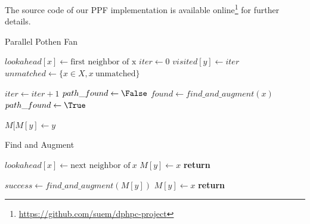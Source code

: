 \documentclass[letterpaper]{article}
\begin{document}
The source code of our PPF implementation is available online\footnote{\url{https://github.com/suem/dphpc-project}} for further details.\\

\begin{algorithm}
    \caption{Parallel Pothen Fan}
    \label{alg:ppf}
    \begin{algorithmic}[1]

        \State $lookahead[x] \gets \text{first neighbor of x}$ 
        \State $iter \gets 0$
        \State $visited[y] \gets iter$ 
        \State $unmatched \gets \{x \in X, x \ \text{unmatched}\}$

        \Repeat 
            \State $iter \gets iter + 1$        
            \State $path\_found \gets \False$        
                \State \Continue {}
            \EndIf
            \State $found \gets find\_and\_augment(x)$        
                \State $path\_found \gets \True$        
            \EndIf
        \EndFor

            \State $M[M[y] \gets y$        
        \EndFor
        
        \EndProcedure
    \end{algorithmic}
\end{algorithm}


\begin{algorithm}
    \caption{Find and Augment}
    \label{alg:fa}
    \begin{algorithmic}[1]


                \State $lookahead[x] \gets \text{next neighbor of}\ x$
                        \State $M[y] \gets x$ 
                        \State \textbf{return} \True
                    \EndIf
                \EndIf
            \EndFor
            
                    \State $success \gets find\_and\_augment(M[y])$
                        \State $M[y] \gets x$ 
                        \State \textbf{return} \True
                    \EndIf
                \EndIf
            \EndFor
        \EndProcedure
    \end{algorithmic}
\end{algorithm}
\end{document}

